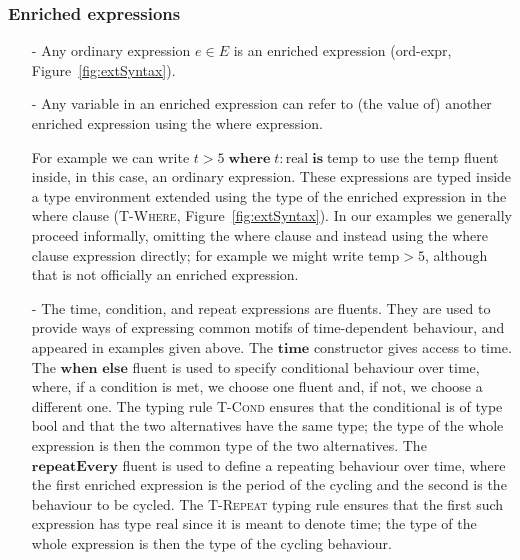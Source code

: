 \subsubsection*{Enriched expressions}
\begin{itemize}

\item[-]%
 Any ordinary expression $e \in E$
 is an enriched expression (\textsf{ord-expr}, Figure~\ref{fig:extSyntax}). 
%
\item[-] Any variable in an enriched expression can refer to (the value of)
  another enriched expression using the \textsf{where} expression.

  For example we can write
  $t > 5 \; \mathbf{where} \; t : \mathrm{real} \; \mathbf{is} \; \mathrm{temp}$
  to use the $\mathrm{temp}$ fluent inside, in this case, an ordinary
  expression. %
  These expressions %
  are typed inside a type environment extended using the type of the enriched
  expression in the where clause (\textsc{T-Where},
  Figure~\ref{fig:extSyntax}). In our examples we generally proceed informally,
  omitting the where clause and instead using the where clause expression
  directly; %
  for example we might write $\mathrm{temp} > 5$, although that is not
  officially an enriched expression.

\item[-] %
  The \textsf{time}, \textsf{condition}, and \textsf{repeat} expressions are
  fluents. They are used to provide ways of expressing common motifs of
  time-dependent behaviour, and appeared in examples given
  above. %
  The $\mathbf{time}$ constructor gives access to time. The $\mathbf{when}$
  $\mathbf{else}$ fluent is used to specify conditional behaviour over time,
  where, if a condition is met, we choose one fluent and, if not, we choose a
  different one. The typing rule \textsc{T-Cond} ensures that the conditional is
  of type $\mathrm{bool}$ and that the two alternatives have the same type; the
  type of the whole expression is then the common type of the two
  alternatives. The $\mathbf{repeatEvery}$ fluent is used to define a repeating
  behaviour over time, where the first enriched expression is the period of the
  cycling and the second is the behaviour to be cycled. The \textsc{T-Repeat}
  typing rule ensures that the first such expression has type $\mathrm{real}$
  since it is meant to denote time; the type of the whole expression is then the
  type of the cycling behaviour.


\end{itemize}
